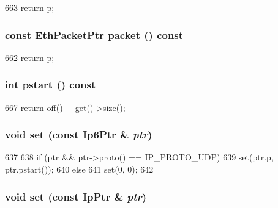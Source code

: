 \begin{DoxyCode}
663 { return p; }
\end{DoxyCode}
\hypertarget{classNet_1_1UdpPtr_a13e32a6fa7b2f1b41d1d8dc32d8fda9e}{
\subsubsection[{packet}]{\setlength{\rightskip}{0pt plus 5cm}const {\bf EthPacketPtr} packet () const}}
\label{classNet_1_1UdpPtr_a13e32a6fa7b2f1b41d1d8dc32d8fda9e}



\begin{DoxyCode}
662 { return p; }
\end{DoxyCode}
\hypertarget{classNet_1_1UdpPtr_ae6fc8073bc02ff3fd03030e0936d56eb}{
\subsubsection[{pstart}]{\setlength{\rightskip}{0pt plus 5cm}int pstart () const}}
\label{classNet_1_1UdpPtr_ae6fc8073bc02ff3fd03030e0936d56eb}



\begin{DoxyCode}
667 { return off() + get()->size(); }
\end{DoxyCode}
\hypertarget{classNet_1_1UdpPtr_aff41448998f095ea26efa08f89bb1c7d}{
\subsubsection[{set}]{\setlength{\rightskip}{0pt plus 5cm}void set (const {\bf Ip6Ptr} \& {\em ptr})}}
\label{classNet_1_1UdpPtr_aff41448998f095ea26efa08f89bb1c7d}



\begin{DoxyCode}
637     {
638         if (ptr && ptr->proto() == IP_PROTO_UDP)
639             set(ptr.p, ptr.pstart());
640         else
641             set(0, 0);
642     }
\end{DoxyCode}
\hypertarget{classNet_1_1UdpPtr_a0a0778623a259833ee4dc0317212ffec}{
\subsubsection[{set}]{\setlength{\rightskip}{0pt plus 5cm}void set (const {\bf IpPtr} \& {\em ptr})}}
\label{classNet_1_1UdpPtr_a0a0778623a259833ee4dc0317212ffec}



